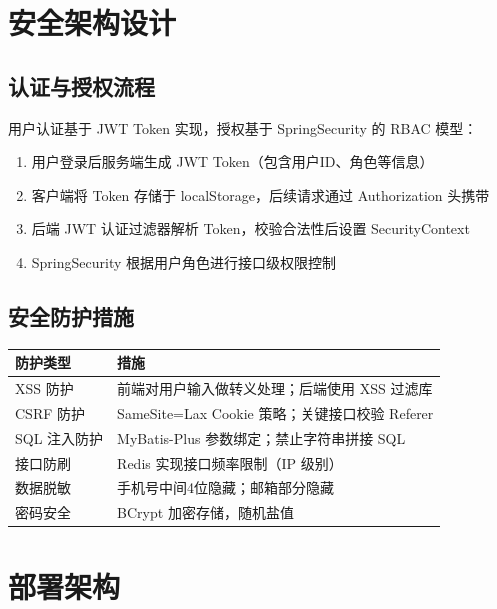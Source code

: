 \documentclass[12pt,a4paper,UTF8]{ctexart}
\begin{document}
\section{安全架构设计}

\subsection{认证与授权流程}

用户认证基于 JWT Token 实现，授权基于 SpringSecurity 的 RBAC 模型：

\begin{enumerate}[itemsep=3pt]
    \item 用户登录后服务端生成 JWT Token（包含用户ID、角色等信息）
    \item 客户端将 Token 存储于 localStorage，后续请求通过 Authorization 头携带
    \item 后端 JWT 认证过滤器解析 Token，校验合法性后设置 SecurityContext
    \item SpringSecurity 根据用户角色进行接口级权限控制
\end{enumerate}

\subsection{安全防护措施}

\begin{longtable}{p{}|p{}}
    \toprule
    \textbf{防护类型} & \textbf{措施} \\
    \midrule
    \endhead
    \bottomrule
    \endfoot

    XSS 防护 & 前端对用户输入做转义处理；后端使用 XSS 过滤库 \\
    CSRF 防护 & SameSite=Lax Cookie 策略；关键接口校验 Referer \\
    SQL 注入防护 & MyBatis-Plus 参数绑定；禁止字符串拼接 SQL \\
    接口防刷 & Redis 实现接口频率限制（IP 级别） \\
    数据脱敏 & 手机号中间4位隐藏；邮箱部分隐藏 \\
    密码安全 & BCrypt 加密存储，随机盐值 \\
\end{longtable}

\section{部署架构}
\end{document}
